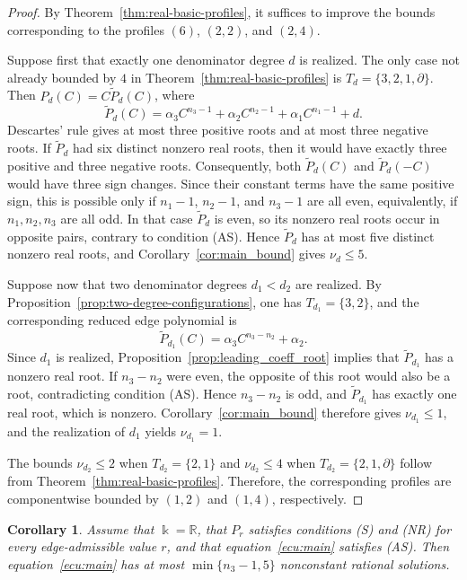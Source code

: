\documentclass[12pt,a4paper]{amsart}
\numberwithin{theorem}{section}
\newtheorem{corollary}[theorem]{Corollary}
\theoremstyle{definition}
\begin{document}
	\begin{proof}
		By Theorem~\ref{thm:real-basic-profiles}, it suffices to improve the bounds corresponding to the profiles $(6)$, $(2,2)$, and $(2,4)$.
		
		Suppose first that exactly one denominator degree $d$ is realized. The only case not already bounded by $4$ in Theorem~\ref{thm:real-basic-profiles} is $T_d=\{3,2,1,\partial\}$. Then $P_d(C)=C\widetilde P_d(C)$, where
		\[
		\widetilde P_d(C)=\alpha_3C^{n_3-1}+\alpha_2C^{n_2-1}+\alpha_1C^{n_1-1}+d.
		\]
		Descartes' rule gives at most three positive roots and at most three negative roots. If $\widetilde P_d$ had six distinct nonzero real roots, then it would have exactly three positive and three negative roots. Consequently, both $\widetilde P_d(C)$ and $\widetilde P_d(-C)$ would have three sign changes. Since their constant terms have the same positive sign, this is possible only if $n_1-1$, $n_2-1$, and $n_3-1$ are all even, equivalently, if $n_1,n_2,n_3$ are all odd. In that case $\widetilde P_d$ is even, so its nonzero real roots occur in opposite pairs, contrary to condition {\rm (AS)}. Hence $\widetilde P_d$ has at most five distinct nonzero real roots, and Corollary~\ref{cor:main_bound} gives $\nu_d\leq5$.
		
		Suppose now that two denominator degrees $d_1<d_2$ are realized. By Proposition~\ref{prop:two-degree-configurations}, one has $T_{d_1}=\{3,2\}$, and the corresponding reduced edge polynomial is
		\[
		\widetilde P_{d_1}(C)
		=\alpha_3C^{n_3-n_2}+\alpha_2.
		\]
		Since $d_1$ is realized, Proposition~\ref{prop:leading_coeff_root} implies that $\widetilde P_{d_1}$ has a nonzero real root. If $n_3-n_2$ were even, the opposite of this root would also be a root, contradicting condition {\rm (AS)}. Hence $n_3-n_2$ is odd, and $\widetilde P_{d_1}$ has exactly one real root, which is nonzero. Corollary~\ref{cor:main_bound} therefore gives $\nu_{d_1}\leq1$, and the realization of $d_1$ yields $\nu_{d_1}=1$.
		
		The bounds $\nu_{d_2}\leq2$ when $T_{d_2}=\{2,1\}$ and $\nu_{d_2}\leq4$ when $T_{d_2}=\{2,1,\partial\}$ follow from Theorem~\ref{thm:real-basic-profiles}. Therefore, the corresponding profiles are componentwise bounded by $(1,2)$ and $(1,4)$, respectively.
	\end{proof}
	
	\begin{corollary}\label{cor:sharp-real-bound}
		Assume that $\Bbbk=\mathbb{R}$, that $P_r$ satisfies conditions {\rm (S)} and {\rm (NR)} for every edge-admissible value $r$, and that equation~\eqref{ecu:main} satisfies {\rm (AS)}. Then equation~\eqref{ecu:main} has at most $\min\{n_3-1,5\}$ nonconstant rational solutions.
	\end{corollary}
	
\end{document}
